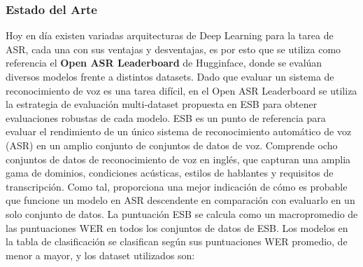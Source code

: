 \documentclass[conference]{IEEEtran}
\begin{document}
\subsubsection{Estado del Arte}
Hoy en día existen variadas arquitecturas de Deep Learning para la tarea de ASR, cada una con sus ventajas y desventajas, es por esto que se utiliza como referencia el \textbf{Open ASR Leaderboard} de Hugginface, donde se evalúan diversos modelos frente a distintos datasets. Dado que evaluar un sistema de reconocimiento de voz es una tarea difícil, en el Open ASR Leaderboard se utiliza la estrategia de evaluación multi-dataset propuesta en ESB \cite{gandhi2022esb} para obtener evaluaciones robustas de cada modelo.
ESB es un punto de referencia para evaluar el rendimiento de un único sistema de reconocimiento automático de voz (ASR) en un amplio conjunto de conjuntos de datos de voz. Comprende ocho conjuntos de datos de reconocimiento de voz en inglés, que capturan una amplia gama de dominios, condiciones acústicas, estilos de hablantes y requisitos de transcripción. Como tal, proporciona una mejor indicación de cómo es probable que funcione un modelo en ASR descendente en comparación con evaluarlo en un solo conjunto de datos.
La puntuación ESB se calcula como un macropromedio de las puntuaciones WER en todos los conjuntos de datos de ESB. Los modelos en la tabla de clasificación se clasifican según sus puntuaciones WER promedio, de menor a mayor, y los dataset utilizados son:
\end{document}
